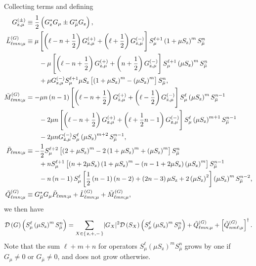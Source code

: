 \documentclass[aps,pra,twocolumn,longbibliography]{revtex4-2}
\newcommand{\f}[2]{\dfrac{#1}{#2}} %
\newcommand{\p}[1]{\left( #1 \right)} %
\renewcommand{\sp}[1]{\left[ #1 \right]} %
\renewcommand{\abs}[1]{\lvert #1 \rvert}
\newcommand{\D}{\mathcal{D}}
\newcommand{\z}{\text{z}}
\newcommand{\bmu}{{\bar\mu}}
\newcommand{\1}{\mathds{1}}
\begin{document}
Collecting terms and defining
\begin{align}
  G_{\z,\mu}^{(\pm)}
  &\equiv \f12\p{G_\z^* G_\mu \pm G_\bmu^* G_\z},
  \allowdisplaybreaks \\
  \tilde L_{\ell mn;\mu}^{(G)}
  &\equiv \mu \sp{\p{\ell-n+\f12} G_{\z,\mu}^{(+)}
    + \p{\ell+\f12} G_{\z,\mu}^{(-)}}
  S_\mu^{\ell+1} \p{1+\mu S_\z}^m S_\bmu^n \notag \\
  &\qquad -\mu \sp{\p{\ell-n+\f12} G_{\z,\mu}^{(+)}
    + \p{n+\f12} G_{\z,\mu}^{(-)}}
  S_\mu^{\ell+1} \p{\mu S_\z}^m S_\bmu^n \notag \\
  &\qquad + \mu G_{\z,\mu}^{(-)}
  S_\mu^{\ell+1} \mu S_\z
  \sp{\p{1+\mu S_\z}^m - \p{\mu S_\z}^m} S_\bmu^n,
  \allowdisplaybreaks \\
  \tilde M_{\ell mn;\mu}^{(G)}
  &= -\mu n\p{n-1} \sp{\p{\ell-n+\f12} G_{\z,\mu}^{(+)}
    + \p{\ell-\f12} G_{\z,\mu}^{(-)}}
  S_\mu^\ell \p{\mu S_\z}^m S_\bmu^{n-1} \notag \\
  &\qquad - 2\mu n \sp{\p{\ell-n+\f12} G_{\z,\mu}^{(+)}
    + \p{\ell+\f12n-1} G_{\z,\mu}^{(-)}}
  S_\mu^\ell \p{\mu S_\z}^{m+1} S_\bmu^{n-1} \notag \\
  &\qquad - 2\mu n G_{\z,\mu}^{(-)}
  S_\mu^\ell \p{\mu S_\z}^{m+2} S_\bmu^{n-1},
  \allowdisplaybreaks \\
  \tilde P_{\ell mn;\mu}
  &\equiv -\f12 S_\mu^{\ell+2}
  \sp{\p{2+\mu S_\z}^m - 2\p{1+\mu S_\z}^m + \p{\mu S_\z}^m}
  S_\bmu^n \notag \\
  &\qquad + n S_\mu^{\ell+1} \sp{\p{n+2\mu S_\z} \p{1+\mu S_\z}^m
    - \p{n-1+2\mu S_\z} \p{\mu S_\z}^m}
  S_\bmu^{n-1} \notag \\
  &\qquad -n\p{n-1} S_\mu^\ell
  \sp{\f12\p{n-1}\p{n-2} + \p{2n-3}\mu S_\z + 2\p{\mu S_\z}^2}
  \p{\mu S_\z}^m S_\bmu^{n-2},
  \allowdisplaybreaks \\
  \tilde Q_{\ell mn;\mu}^{(G)}
  &\equiv G_\bmu^* G_\mu \tilde P_{\ell mn;\mu}
  + \tilde L_{\ell mn;\mu}^{(G)}
  + \tilde M_{\ell mn;\mu}^{(G)},
\end{align}
we then have
\begin{align}
  \D\p{G} \p{S_\mu^\ell \p{\mu S_\z}^m S_\bmu^n}
  = \sum_{X\in\set{\z,+,-}} \abs{G_X}^2
  \D\p{S_X} \p{S_\mu^\ell \p{\mu S_\z}^m S_\bmu^n}
  + \tilde Q_{\ell mn;\mu}^{(G)}
  + \sp{\tilde Q_{nm\ell;\mu}^{(G)}}^\dag.
\end{align}
Note that the sum $\ell+m+n$ for operators
$S_\mu^\ell \p{\mu S_\z}^m S_\bmu^n$ grows by one if $G_\mu\ne0$ or
$G_\bmu\ne0$, and does not grow otherwise.
\end{document}
